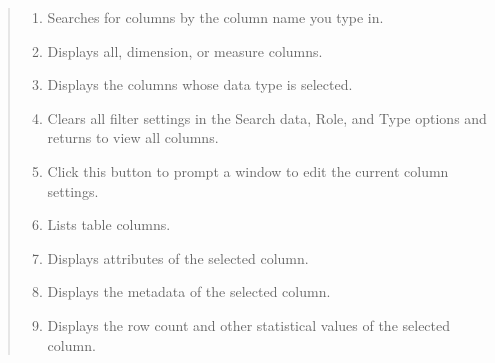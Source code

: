 \documentclass[letterpaper,10pt,english]{sphinxmanual}
\begin{document}
\begin{quote}

\begin{figure}[H]
\centering

\noindent{}
\end{figure}
\begin{enumerate}
\def\theenumi{\arabic{enumi}}
\def\labelenumi{\theenumi .}
\makeatletter\def\p@enumii{\p@enumi \theenumi .}\makeatother
\item {} 
 Searches for columns by the column name you type in.

\item {} 
 Displays all, dimension, or measure columns.

\item {} 
 Displays the columns whose data type is selected.

\item {} 
 Clears all filter settings in the Search data, Role, and Type options and returns to view all columns.

\item {} 
 Click this button to prompt a window to edit the current column settings.

\item {} 
 Lists table columns.

\item {} 
 Displays attributes of the selected column.

\item {} 
 Displays the metadata of the selected column.

\item {} 
 Displays the row count and other statistical values of the selected column.

\end{enumerate}
\end{quote}

\end{document}
